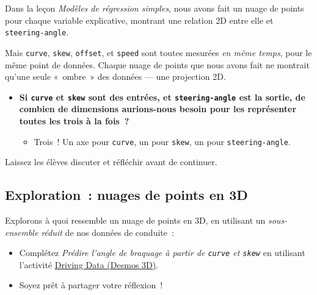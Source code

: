 \documentclass[12pt,a4paper]{article}
\begin{document}
Dans la leçon \emph{Modèles de régression simples}, nous avons fait un nuage de points pour chaque variable explicative, montrant une relation 2D entre elle et \texttt{steering-angle}.

Mais \texttt{curve}, \texttt{skew}, \texttt{offset}, et \texttt{speed} sont toutes mesurées \emph{en même temps}, pour le même point de données. Chaque nuage de points que nous avons fait ne montrait qu'une seule «~ombre~» des données — une projection 2D.

\begin{thinkbox}
  \begin{itemize}
    \item \textbf{Si \texttt{curve} et \texttt{skew} sont des entrées, et \texttt{steering-angle} est la sortie, de combien de dimensions aurions-nous besoin pour les représenter toutes les trois à la fois~?}
    \begin{itemize}
      \item Trois~! Un axe pour \texttt{curve}, un pour \texttt{skew}, un pour \texttt{steering-angle}.
    \end{itemize}
  \end{itemize}

  Laissez les élèves discuter et réfléchir avant de continuer.
\end{thinkbox}

\subsection{Exploration~: nuages de points en 3D}

\begin{activitybox}
  Explorons à quoi ressemble un nuage de points en 3D, en utilisant un \emph{sous-ensemble réduit} de nos données de conduite~:

  \begin{itemize}
    \item Complétez \emph{Prédire l'angle de braquage à partir de \texttt{curve} \emph{et} \texttt{skew}} en utilisant l'activité \href{https://www.desmos.com/3d/omnchml87a}{Driving Data (Desmos 3D)}.
    \item Soyez prêt à partager votre réflexion~!
  \end{itemize}
\end{activitybox}
\end{document}
